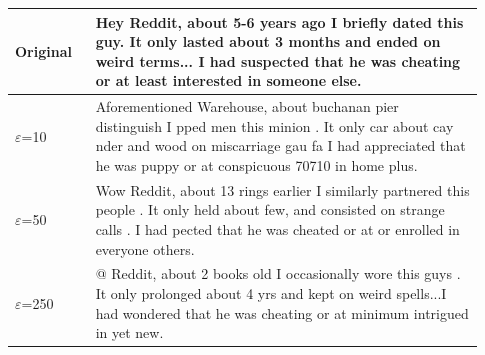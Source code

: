 \begin{tabular}{@{}p{0.16\linewidth}p{0.77\linewidth}@{}}
\toprule
Original & Hey Reddit, about 5-6 years ago I briefly dated this guy. It only lasted about 3 months and ended on weird terms... I had suspected that he was cheating or at least interested in someone else. \\
\midrule
$\varepsilon$=10 & Aforementioned Warehouse, about buchanan pier distinguish I pped men this minion . It only car about cay nder and wood on miscarriage gau fa I had appreciated that he was puppy or at conspicuous 70710 in home plus. \\
$\varepsilon$=50 & Wow Reddit, about 13 rings earlier I similarly partnered this people . It only held about few, and consisted on strange calls . I had pected that he was cheated or at or enrolled in everyone others. \\
$\varepsilon$=250 & @ Reddit, about 2 books old I occasionally wore this guys . It only prolonged about 4 yrs and kept on weird spells...I had wondered that he was cheating or at minimum intrigued in yet new. \\
\bottomrule
\end{tabular}
